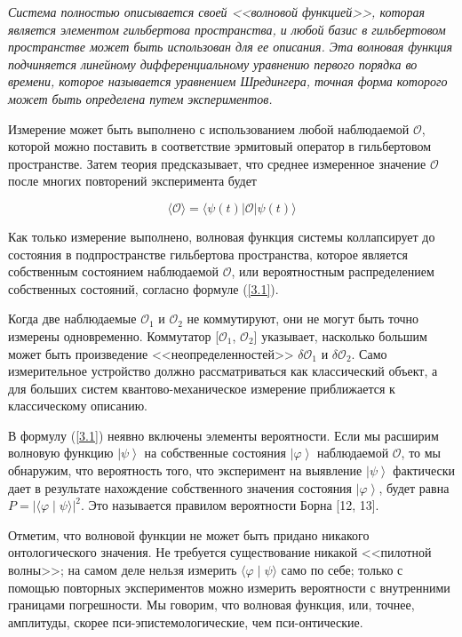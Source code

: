 \documentclass[main.tex]{subfiles}
\begin{document}
\textit{Система полностью описывается своей <<волновой функцией>>, которая является элементом гильбертова пространства, и любой базис в гильбертовом пространстве может быть использован для ее описания. Эта волновая функция подчиняется линейному дифференциальному уравнению первого порядка во времени, которое называется уравнением Шредингера, точная форма которого может быть определена путем  экспериментов.}

Измерение может быть выполнено с использованием любой наблюдаемой $\mathcal{O}$, которой можно поставить в соответствие эрмитовый оператор в гильбертовом пространстве. Затем теория предсказывает, что среднее измеренное значение $\mathcal{O}$ после многих повторений эксперимента будет

\begin{equation}\label{3.1}
	\langle\mathcal{O}\rangle=\langle\psi(t)|\mathcal{O}| \psi(t)\rangle
\end{equation}

Как только измерение выполнено, волновая функция системы коллапсирует до состояния в подпространстве гильбертова пространства, которое является собственным состоянием наблюдаемой $\mathcal{O}$, или вероятностным распределением собственных состояний, согласно формуле (\ref{3.1}).

Когда две наблюдаемые $\mathcal{O}_1$ и $\mathcal{O}_2$ не коммутируют, они не могут быть точно измерены одновременно. Коммутатор [$\mathcal{O}_1$, $\mathcal{O}_2$] указывает, насколько большим может быть произведение <<неопределенностей>> $\delta\mathcal{O}_1$ и $\delta\mathcal{O}_2$. Само измерительное устройство должно рассматриваться как классический объект, а для больших систем квантово-механическое измерение приближается к классическому описанию.

В формулу (\ref{3.1}) неявно включены элементы вероятности. Если мы расширим волновую функцию $\left | \psi \right>$ на собственные состояния $\left | \varphi \right>$ наблюдаемой $\mathcal{O}$, то мы обнаружим, что вероятность того, что эксперимент на выявление $\left | \psi \right>$ фактически дает в результате нахождение собственного значения состояния $\left | \varphi \right>$, будет равна $P = \left| \langle\varphi\mid\psi\rangle \right|^2$. Это называется правилом вероятности Борна [12, 13].

Отметим, что волновой функции не может быть придано никакого онтологического значения. Не требуется существование никакой <<пилотной волны>>; на самом деле нельзя измерить $\langle\varphi\mid\psi\rangle$ само по себе; только с помощью повторных экспериментов можно измерить вероятности с внутренними границами погрешности. Мы говорим, что волновая функция, или, точнее, амплитуды, скорее пси-эпистемологические, чем пси-онтические.
\end{document}

